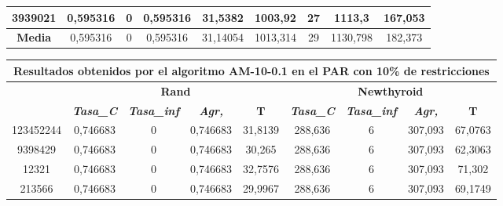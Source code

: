 \documentclass[12pt, spanish]{article}
\begin{document}
\begin{table}[H]
\begin{tabular}{|c|c|c|c|c|c|c|c|c|}
3939021           & 0,595316                  & 0                           & 0,595316               & 31,5382    & 1003,92                   & 27                          & 1113,3                 & 167,053    \\ \hline
\textbf{Media}    & 0,595316                  & 0                           & 0,595316               & 31,14054   & 1013,314                  & 29                          & 1130,798               & 182,373    \\ \hline
\end{tabular}
\end{table}


\begin{table}[H]
\footnotesize
\begin{tabular}{|c|c|c|c|c|c|c|c|c|}
\hline
\multicolumn{9}{|c|}{\textbf{Resultados obtenidos por el algoritmo AM-10-0.1 en el PAR con 10\% de restricciones}}                                                                                                \\ \hline
\multirow{2}{*}{} & \multicolumn{4}{c|}{\textbf{Rand}}                                                            & \multicolumn{4}{c|}{\textbf{Newthyroid}}                                                      \\ \cline{2-9} 
                  & \textit{\textbf{Tasa\_C}} & \textit{\textbf{Tasa\_inf}} & \textit{\textbf{Agr,}} & \textbf{T} & \textit{\textbf{Tasa\_C}} & \textit{\textbf{Tasa\_inf}} & \textit{\textbf{Agr,}} & \textbf{T} \\ \hline
123452244         & 0,746683                  & 0                           & 0,746683               & 31,8139    & 288,636                   & 6                           & 307,093                & 67,0763    \\ \hline
9398429           & 0,746683                  & 0                           & 0,746683               & 30,265     & 288,636                   & 6                           & 307,093                & 62,3063    \\ \hline
12321             & 0,746683                  & 0                           & 0,746683               & 32,7576    & 288,636                   & 6                           & 307,093                & 71,302     \\ \hline
213566            & 0,746683                  & 0                           & 0,746683               & 29,9967    & 288,636                   & 6                           & 307,093                & 69,1749    \\ \hline

\end{tabular}
\end{table}
\end{document}
